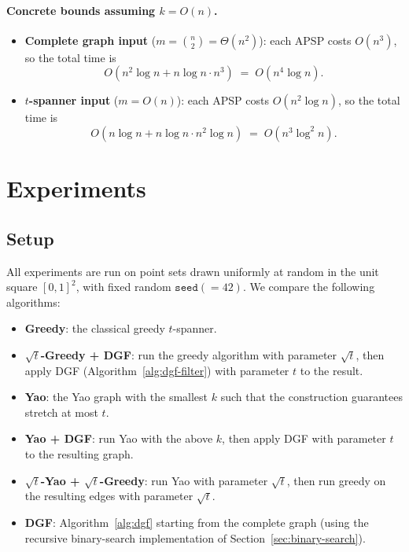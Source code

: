 \documentclass{article}
\begin{document}
\paragraph{Concrete bounds assuming $k=O(n)$.}
\begin{itemize}
    \item \textbf{Complete graph input} ($m=\binom{n}{2}=\Theta(n^2)$):
    each APSP costs $O(n^3)$, so the total time is
    \[
        O(n^2\log n + n\log n\cdot n^3) \;=\; O(n^4 \log n).
    \]
    \item \textbf{$t$-spanner input} ($m=O(n)$): each APSP costs
    $O(n^2\log n)$, so the total time is
    \[
        O(n\log n + n\log n\cdot n^2\log n) \;=\; O(n^3 \log^2 n).
    \]
\end{itemize}

\newpage

\section{Experiments}
\label{sec:experiments}

\subsection{Setup}
All experiments are run on point sets drawn uniformly at random in the
unit square $[0,1]^2$, with fixed random $\mathtt{seed} (=42)$. We
compare the following algorithms:
\begin{itemize}
    \item \textbf{Greedy}: the classical greedy
          $t$-spanner.
    \item \textbf{$\sqrt{t}$-Greedy + DGF}: run the greedy algorithm
          with parameter $\sqrt{t}$, then apply DGF
          (Algorithm~\ref{alg:dgf-filter}) with parameter $t$ to the
          result.
    \item \textbf{Yao}: the Yao graph with the smallest $k$ such that
          the construction guarantees stretch at most $t$.
    \item \textbf{Yao + DGF}: run Yao with the above $k$, then apply
          DGF with parameter $t$ to the resulting graph.
    \item \textbf{$\sqrt{t}$-Yao + $\sqrt{t}$-Greedy}: run Yao with
          parameter $\sqrt{t}$, then run greedy on the resulting edges
          with parameter $\sqrt{t}$.
    \item \textbf{DGF}: Algorithm~\ref{alg:dgf} starting from the
          complete graph (using the recursive binary-search
          implementation of Section~\ref{sec:binary-search}).
\end{itemize}
\end{document}
